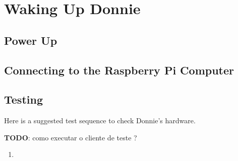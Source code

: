\chapter{Waking Up Donnie}

\section{Power Up}
\label{sec:power}

\section{Connecting to the Raspberry Pi Computer}
\label{sec:rpi}


\section{Testing }
\label{sec:test}

Here is a suggested test sequence to check Donnie's hardware.

{\bf TODO}: como executar o cliente de teste ?

\begin{enumerate}
\item 
\end{enumerate}


